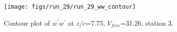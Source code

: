 \begin{figure}[H]
\centering
\texttt{[image: figs/run\_29/run\_29\_ww\_contour]}
\caption{Contour plot of $\overline{w^\prime w^\prime}$ at $z/c$=7.75, $V_{free}$=31.26, station 3.}
\label{fig:run_29_ww_contour}
\end{figure}


